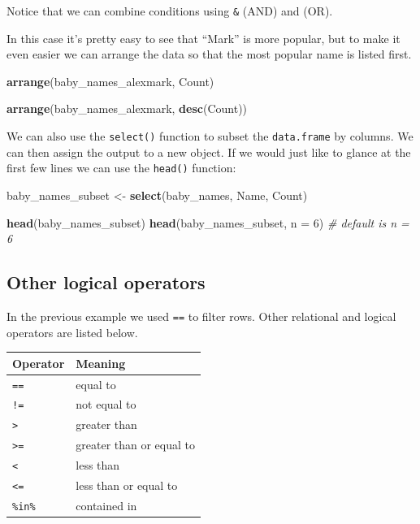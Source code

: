 \documentclass[]{book}
\newenvironment{Shaded}{\begin{snugshade}}{\end{snugshade}}
\newcommand{\KeywordTok}[1]{\textcolor[rgb]{0.13,0.29,0.53}{\textbf{#1}}}
\newcommand{\DataTypeTok}[1]{\textcolor[rgb]{0.13,0.29,0.53}{#1}}
\newcommand{\DecValTok}[1]{\textcolor[rgb]{0.00,0.00,0.81}{#1}}
\newcommand{\StringTok}[1]{\textcolor[rgb]{0.31,0.60,0.02}{#1}}
\newcommand{\CommentTok}[1]{\textcolor[rgb]{0.56,0.35,0.01}{\textit{#1}}}
\newcommand{\NormalTok}[1]{#1}
\begin{document}
Notice that we can combine conditions using \texttt{\&} (AND) and
\texttt{\textbar{}} (OR).

In this case it's pretty easy to see that ``Mark'' is more popular, but
to make it even easier we can arrange the data so that the most popular
name is listed first.

\begin{Shaded}
\begin{Highlighting}[]
\KeywordTok{arrange}\NormalTok{(baby_names_alexmark, Count)}
\end{Highlighting}
\end{Shaded}

\begin{Shaded}
\begin{Highlighting}[]
\KeywordTok{arrange}\NormalTok{(baby_names_alexmark, }\KeywordTok{desc}\NormalTok{(Count))}
\end{Highlighting}
\end{Shaded}

We can also use the \texttt{select()} function to subset the
\texttt{data.frame} by columns. We can then assign the output to a new
object. If we would just like to glance at the first few lines we can
use the \texttt{head()} function:

\begin{Shaded}
\begin{Highlighting}[]
\NormalTok{baby_names_subset <-}\StringTok{ }\KeywordTok{select}\NormalTok{(baby_names, Name, Count)}

\KeywordTok{head}\NormalTok{(baby_names_subset)}
\KeywordTok{head}\NormalTok{(baby_names_subset, }\DataTypeTok{n =} \DecValTok{6}\NormalTok{) }\CommentTok{# default is n = 6}
\end{Highlighting}
\end{Shaded}

\subsection{Other logical operators}\label{other-logical-operators}

In the previous example we used \texttt{==} to filter rows. Other
relational and logical operators are listed below.

\begin{longtable}[]{@{}ll@{}}
\toprule
Operator & Meaning\tabularnewline
\midrule
\endhead
\texttt{==} & equal to\tabularnewline
\texttt{!=} & not equal to\tabularnewline
\texttt{\textgreater{}} & greater than\tabularnewline
\texttt{\textgreater{}=} & greater than or equal to\tabularnewline
\texttt{\textless{}} & less than\tabularnewline
\texttt{\textless{}=} & less than or equal to\tabularnewline
\texttt{\%in\%} & contained in\tabularnewline
\bottomrule
\end{longtable}
\end{document}
